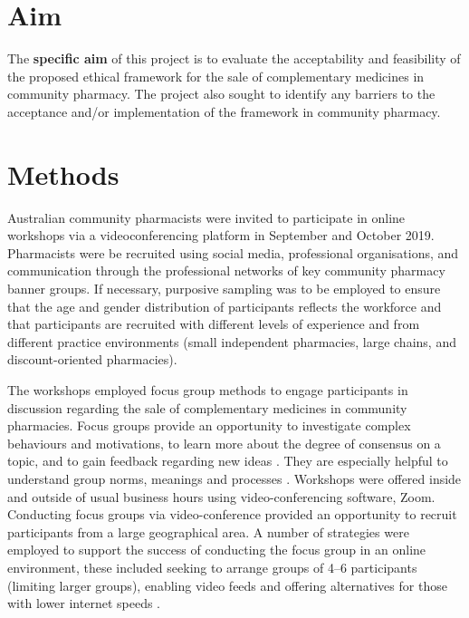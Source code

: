 \documentclass[11pt,a4paper]{article}
\begin{document}
\section{Aim}\label{aim}

The \textbf{specific aim} of this project is to evaluate the
acceptability and feasibility of the proposed ethical framework for the
sale of complementary medicines in community pharmacy. The project also
sought to identify any barriers to the acceptance and/or implementation
of the framework in community pharmacy.

\section{Methods}\label{methods}

Australian community pharmacists were invited to participate in online
workshops via a videoconferencing platform in September and October
2019. Pharmacists were be recruited using social media, professional
organisations, and communication through the professional networks of
key community pharmacy banner groups. If necessary, purposive sampling
was to be employed to ensure that the age and gender distribution of
participants reflects the workforce and that participants are recruited
with different levels of experience and from different practice
environments (small independent pharmacies, large chains, and
discount-oriented pharmacies).

The workshops employed focus group methods to engage participants in
discussion regarding the sale of complementary medicines in community
pharmacies. Focus groups provide an opportunity to investigate complex
behaviours and motivations, to learn more about the degree of consensus
on a topic, and to gain feedback regarding new ideas
\autocites{Basch1987}{Knodel1993}. They are especially helpful to
understand group norms, meanings and processes \autocite{BarbourFG2011}.
Workshops were offered inside and outside of usual business hours using
video-conferencing software, Zoom. Conducting focus groups via
video-conference provided an opportunity to recruit participants from a
large geographical area. A number of strategies were employed to support
the success of conducting the focus group in an online environment,
these included seeking to arrange groups of 4--6 participants (limiting
larger groups), enabling video feeds and offering alternatives for those
with lower internet speeds \autocite{Gaiser2017}.
\end{document}
